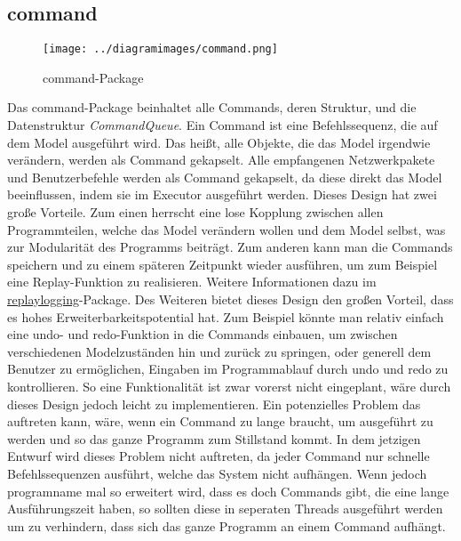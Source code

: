 \subsection{command}
\label{subsec:command}

\begin{figure}[H]
  \centering
  \texttt{[image: ../diagramimages/command.png]}
  \caption{command-Package}
\end{figure}

\medskip
Das command-Package beinhaltet alle Commands, deren Struktur, und die Datenstruktur
\textit{CommandQueue}. Ein Command ist eine Befehlssequenz, die auf
dem Model ausgeführt wird. Das heißt, alle Objekte, die das Model irgendwie verändern,
werden als Command gekapselt. Alle empfangenen Netzwerkpakete
und Benutzerbefehle werden als Command gekapselt, da diese direkt das Model beeinflussen,
indem sie im Executor ausgeführt werden.
\newline
\newline
Dieses Design hat zwei große Vorteile. Zum einen herrscht eine lose Kopplung zwischen
allen Programmteilen, welche das Model verändern wollen und dem Model selbst, was zur Modularität des
Programms beiträgt. Zum anderen kann man die Commands speichern und zu einem
späteren Zeitpunkt wieder ausführen, um zum Beispiel eine Replay-Funktion zu realisieren. Weitere Informationen dazu im
\hyperref[subsubsec:replaylogging]{replaylogging}-Package. Des Weiteren bietet dieses
Design den großen Vorteil, dass es hohes Erweiterbarkeitspotential hat. Zum Beispiel
könnte man relativ einfach eine undo- und redo-Funktion in die Commands einbauen, um
zwischen verschiedenen Modelzuständen hin und zurück zu springen, oder generell dem Benutzer zu ermöglichen, Eingaben im Programmablauf durch undo und redo zu kontrollieren. So eine
Funktionalität ist zwar vorerst nicht eingeplant, wäre durch dieses Design jedoch leicht zu implementieren.
\newline
\newline
Ein potenzielles Problem das auftreten kann, wäre, wenn ein Command zu lange braucht, um
ausgeführt zu werden und so das ganze Programm zum Stillstand kommt.
In dem jetzigen Entwurf wird dieses Problem nicht auftreten, da jeder Command
nur schnelle Befehlssequenzen ausführt, welche das System nicht
aufhängen. Wenn jedoch \gls{programname} mal so erweitert wird, dass es doch Commands gibt,
die eine lange Ausführungszeit haben, so sollten diese in seperaten Threads
ausgeführt werden um zu verhindern, dass sich das ganze Programm an einem Command
aufhängt.

